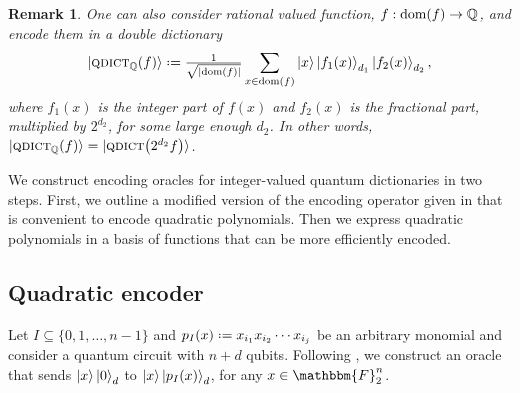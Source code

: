 \documentclass[reqno, 10pt]{amsart}
\numberwithin{equation}{section}                     %
\let\originalleft\left
\let\originalright\right
\renewcommand{\left}{\mathopen{}\mathclose\bgroup\originalleft}
\renewcommand{\right}{\aftergroup\egroup\originalright}
\def\({\mathopen{}\left(}
\def\){\right)\mathclose{}}
\newcommand*{\eqdef}{\mathrel{\vcenter{\baselineskip0.5ex \lineskiplimit0pt\hbox{.}\hbox{.}}}=}
\newtheorem{remark}[theorem]{Remark}
\def\F{\mathbbm{F}}
\def\Q{\mathbb{Q}}
\def\dom{\mathrm{dom}}
\def\qdict{\textsc{qdict}}
\begin{document}
\smallskip

\begin{remark}
     One can also consider rational valued function, $f : \dom \( f \) \rightarrow \Q$, and encode them in a double dictionary
     \begin{equation}
         \ket{\qdict_\Q \( f \)} \eqdef \tfrac{1}{\sqrt{\left| \dom \( f \) \right|}} \sum\limits_{x \in \dom \( f \)} \ket{x} \ket{f_1 (x)}_{d_1} \ket{f_2 (x)}_{d_2},
     \end{equation}
     where $f_1 (x)$ is the integer part of $f (x)$ and $f_2 (x)$ is the fractional part, multiplied by $2^{d_2}$, for some large enough $d_2$. In other words, $\ket{\qdict_\Q \( f \)} = \ket{\qdict \( 2^{d_2} f \)}$.
\end{remark}

\smallskip

We construct encoding oracles for integer-valued quantum dictionaries in two steps. First, we outline a modified version of the encoding operator given in \cite{gilliam_grover_2021} that is convenient to encode quadratic polynomials. Then we express quadratic polynomials in a basis of functions that can be more efficiently encoded.

\medskip

\subsection{Quadratic encoder}
\label{sec:encoder}

Let $I \subseteq \{ 0, 1, \ldots, n - 1 \}$ and $p_I (x) \eqdef x_{i_1} x_{i_2} \cdots x_{i_j}$ be an arbitrary monomial and consider a quantum circuit with $n + d$ qubits. Following \cite{gilliam_grover_2021}, we construct an oracle that sends $\ket{x} \ket{0}_d$ to $\ket{x} \ket{p_I (x)}_d$, for any $x \in \F_2^n$.
\end{document}
